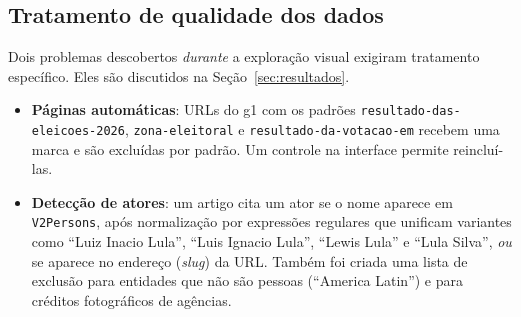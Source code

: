 \documentclass[conference]{IEEEtran}
\begin{document}
\subsection{Tratamento de qualidade dos dados}
Dois problemas descobertos \emph{durante} a exploração visual exigiram tratamento específico. Eles são discutidos na Seção~\ref{sec:resultados}.
\begin{itemize}
  \item \textbf{Páginas automáticas}: URLs do g1 com os padrões \texttt{resultado-das-eleicoes-2026}, \texttt{zona-eleitoral} e \texttt{resultado-da-votacao-em} recebem uma marca e são excluídas por padrão. Um controle na interface permite reincluí-las.
  \item \textbf{Detecção de atores}: um artigo cita um ator se o nome aparece em \texttt{V2Persons}, após normalização por expressões regulares que unificam variantes como ``Luiz Inacio Lula'', ``Luis Ignacio Lula'', ``Lewis Lula'' e ``Lula Silva'', \emph{ou} se aparece no endereço (\emph{slug}) da URL. Também foi criada uma lista de exclusão para entidades que não são pessoas (``America Latin'') e para créditos fotográficos de agências.
\end{itemize}
\end{document}
